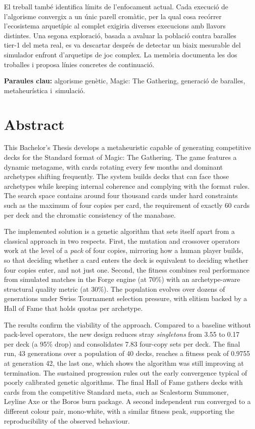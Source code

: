 El treball també identifica límits de l'enfocament actual. Cada execució de l'algorisme convergix a un únic parell cromàtic, per la qual cosa recórrer l'ecosistema arquetípic al complet exigiria diverses execucions amb llavors distintes. Una segona exploració, basada a avaluar la població contra baralles tier-1 del meta real, es va descartar després de detectar un biaix mesurable del simulador enfront d'arquetips de joc complex. La memòria documenta les dos troballes i proposa línies concretes de continuació.

\textbf{Paraules clau:} algorisme genètic, Magic: The Gathering, generació de baralles, metaheurística i~simulació.

\chapter*{Abstract}

This Bachelor's Thesis develops a metaheuristic capable of generating competitive decks for the Standard format of Magic: The Gathering. The game features a dynamic metagame, with cards rotating every few months and dominant archetypes shifting frequently. The system builds decks that can face those archetypes while keeping internal coherence and complying with the format rules. The search space contains around four thousand cards under hard constraints such as the maximum of four copies per card, the requirement of exactly 60 cards per deck and the chromatic consistency of the manabase.

The implemented solution is a genetic algorithm that sets itself apart from a classical approach in two respects. First, the mutation and crossover operators work at the level of a \emph{pack} of four copies, mirroring how a human player builds, so that deciding whether a card enters the deck is equivalent to deciding whether four copies enter, and not just one. Second, the fitness combines real performance from simulated matches in the Forge engine (at 70\%) with an archetype-aware structural quality metric (at 30\%). The population evolves over dozens of generations under Swiss Tournament selection pressure, with elitism backed by a Hall of Fame that holds quotas per archetype.

The results confirm the viability of the approach. Compared to a baseline without pack-level operators, the new design reduces stray \emph{singletons} from 3.55 to 0.17 per deck (a 95\% drop) and consolidates 7.83 four-copy sets per deck. The final run, 43 generations over a population of 40 decks, reaches a fitness peak of 0.9755 at generation 42, the last one, which shows the algorithm was still improving at termination. The sustained progression rules out the early convergence typical of poorly calibrated genetic algorithms. The final Hall of Fame gathers decks with cards from the competitive Standard meta, such as Scalestorm Summoner, Leyline Axe or the Boros burn package. A second independent run converged to a different colour pair, mono-white, with a similar fitness peak, supporting the reproducibility of the observed behaviour.

